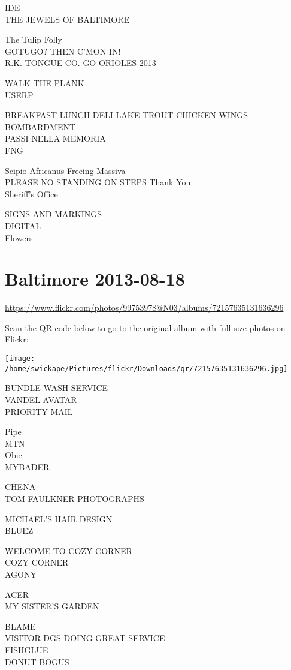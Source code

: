 \documentclass[10pt,letterpaper]{article}
\begin{document}
IDE\\
THE JEWELS OF BALTIMORE

The Tulip Folly\\
GOTUGO? THEN C'MON IN!\\
R.K. TONGUE CO. GO ORIOLES 2013

WALK THE PLANK\\
USERP

BREAKFAST LUNCH DELI LAKE TROUT CHICKEN WINGS\\
BOMBARDMENT\\
PASSI NELLA MEMORIA\\
FNG

Scipio Africanus Freeing Massiva\\
PLEASE NO STANDING ON STEPS Thank You\\
Sheriff's Office

SIGNS AND MARKINGS\\
DIGITAL\\
Flowers


\section*{Baltimore 2013-08-18}

\url{https://www.flickr.com/photos/99753978@N03/albums/72157635131636296}

Scan the QR code below to go to the original album with full-size photos on Flickr:

\texttt{[image: /home/swickape/Pictures/flickr/Downloads/qr/72157635131636296.jpg]}


BUNDLE WASH SERVICE\\
VANDEL AVATAR\\
PRIORITY MAIL

Pipe\\
MTN\\
Obie\\
MYBADER

CHENA\\
TOM FAULKNER PHOTOGRAPHS

MICHAEL'S HAIR DESIGN\\
BLUEZ

WELCOME TO COZY CORNER\\
COZY CORNER\\
AGONY

ACER\\
MY SISTER'S GARDEN

BLAME\\
VISITOR DGS DOING GREAT SERVICE\\
FISHGLUE\\
DONUT BOGUS
\end{document}
